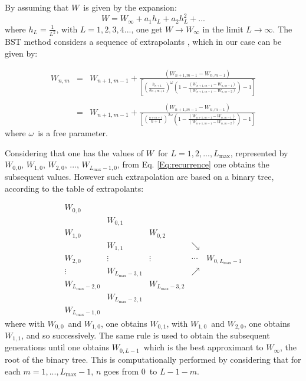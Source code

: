 \documentclass[3p, 10pt, onecolumn]{elsarticle}
\begin{document}
\label{Subsec:BST_method}

By assuming that $W$\ is given by the expansion:%
\begin{equation*}
W=W_{\infty }+a_{1}h_{L}+a_{2}h_{L}^{2}+...
\end{equation*}%
where $h_{L}=\frac{1}{L^{2}}$, with $L=1,2,3,4...$, one get $W\rightarrow
W_{\infty }$ in the limit $L\rightarrow \infty $. The BST method considers a
sequence of extrapolants \cite{BSTHenkel}, which in our case can be given by:

\begin{equation}
\begin{array}{ccc}
W_{n,m} & = & W_{n+1,m-1}+\frac{\left( W_{n+1,m-1}-W_{n,m-1}\right) }{\left[
\left( \frac{h_{n+1}}{h_{n+m+1}}\right) ^{\omega }\left( 1-\frac{\left(
W_{n+1,m-1}-W_{n,m-1}\right) }{\left( W_{n+1,m-1}-W_{n,m-2}\right) }\right)
-1\right] } \\ 
&  &  \\ 
& = & W_{n+1,m-1}+\frac{\left( W_{n+1,m-1}-W_{n,m-1}\right) }{\left[ \left( 
\frac{_{n+m+1}}{n+1}\right) ^{2\omega }\left( 1-\frac{\left(
W_{n+1,m-1}-W_{n,m-1}\right) }{\left( W_{n+1,m-1}-W_{n,m-2}\right) }\right)
-1\right] }%
\end{array}
\label{Eq:recurrence}
\end{equation}%
where $\omega $\ is a free parameter.

Considering that one has the values of $W$\ for $L=1,2,...,L_{\max }$,
represented by $W_{0,0}$, $W_{1,0}$, $W_{2,0}$, ..., $W_{L_{\max }-1,0}$,
from Eq. \ref{Eq:recurrence} one obtains the subsequent values. However such
extrapolation are based on a binary tree, according to the table of
extrapolants:

\begin{equation}
\begin{array}{lllll}
W_{0,0} &  &  &  &  \\ 
& W_{0,1} &  &  &  \\ 
W_{1,0} &  & W_{0,2} &  &  \\ 
& W_{1,1} &  & \searrow &  \\ 
W_{2,0} & \vdots & \vdots & \cdots & W_{0,L_{\max }-1} \\ 
\vdots & W_{L_{\max }-3,1} &  & \nearrow &  \\ 
W_{L_{\max }-2,0} &  & W_{L_{\max }-3,2} &  &  \\ 
& W_{L_{\max }-2,1} &  &  &  \\ 
W_{L_{\max }-1,0} &  &  &  & 
\end{array}
\label{Eq:bynary_tree}
\end{equation}%
where with $W_{0,0}$\ and $W_{1,0}$, one obtains $W_{0,1}$, with $W_{1,0}$\
and $W_{2,0}$, one obtains $W_{1,1}$, and so successively. The same rule is
used to obtain the subsequent generations until one obtains $W_{0,L-1}$\
which is the best approximant to $W_{\infty }$, the root of the binary tree.
This is computationally performed by considering that for each $%
m=1,...,L_{\max }-1$, $n$ goes from $0$\ to $L-1-m$.
\end{document}
